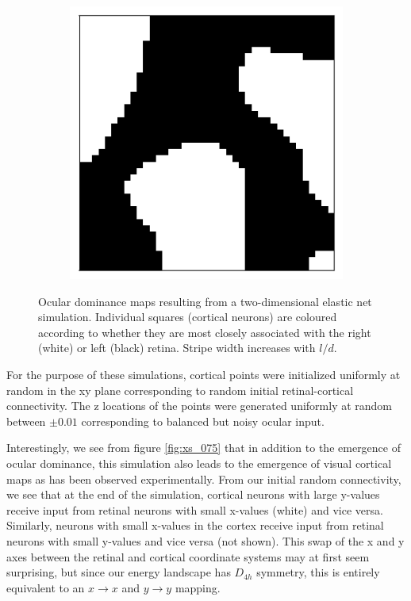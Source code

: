 \documentclass{article}
\begin{document}
\begin{figure}[h]
\begin{subfigure}[t]{0.21\linewidth}
		\label{fig:dom075}	
	\end{subfigure}%
		\hspace{0.05\linewidth}
	\begin{subfigure}[t]{0.21\linewidth}
		\centering
		\includegraphics[width = 1.0\linewidth, trim={5 5 5 10}, clip=true]{figures/N20M40l100d05_2_dominance.png}
		\label{fig:dom100}	
	\end{subfigure}%
\caption{Ocular dominance maps resulting from a two-dimensional elastic net simulation. Individual squares (cortical neurons) are coloured according to whether they are most closely associated with the right (white) or left (black) retina. Stripe width increases with $l/d$.}
\label{fig:widths}
\end{figure}

For the purpose of these simulations, cortical points were initialized uniformly at random in the xy plane corresponding to random initial retinal-cortical connectivity. The z locations of the points were generated uniformly at random between $\pm 0.01$ corresponding to balanced but noisy ocular input.

Interestingly, we see from figure \ref{fig:xs_075} that in addition to the emergence of ocular dominance, this simulation also leads to the emergence of visual cortical maps as has been observed experimentally. From our initial random connectivity, we see that at the end of the simulation, cortical neurons with large y-values receive input from retinal neurons with small x-values (white) and vice versa. Similarly, neurons with small x-values in the cortex receive input from retinal neurons with small y-values and vice versa (not shown). This swap of the x and y axes between the retinal and cortical coordinate systems may at first seem surprising, but since our energy landscape has $D_{4h}$ symmetry, this is entirely equivalent to an $x \rightarrow x$ and $y \rightarrow y$ mapping.
\end{document}
